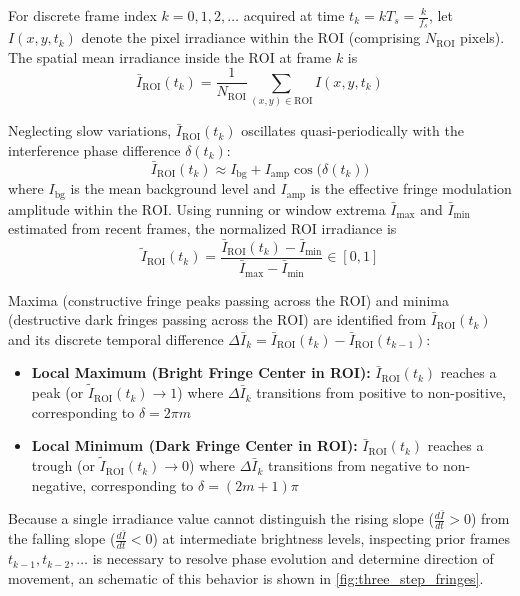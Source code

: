 For discrete frame index $k = 0, 1, 2, \dots$ acquired at time $t_k = k T_s = \frac{k}{f_s}$, let $I(x, y, t_k)$ denote the pixel irradiance within the $\text{ROI}$ (comprising $N_{\text{ROI}}$ pixels). The spatial mean irradiance inside the $\text{ROI}$ at frame $k$ is
\begin{equation}
    \bar{I}_{\text{ROI}}(t_k) = \frac{1}{N_{\text{ROI}}} \sum_{(x, y) \in \text{ROI}} I(x, y, t_k)
    \label{eq:roi_mean_irradiance}
\end{equation}

Neglecting slow variations, $\bar{I}_{\text{ROI}}(t_k)$ oscillates quasi-periodically with the interference phase difference $\delta(t_k)$:
\begin{equation}
    \bar{I}_{\text{ROI}}(t_k) \approx I_{\text{bg}} + I_{\text{amp}} \cos\!\bigl(\delta(t_k)\bigr)
    \label{eq:roi_irradiance_model}
\end{equation}
where $I_{\text{bg}}$ is the mean background level and $I_{\text{amp}}$ is the effective fringe modulation amplitude within the $\text{ROI}$. Using running or window extrema $\bar{I}_{\max}$ and $\bar{I}_{\min}$ estimated from recent frames, the normalized ROI irradiance is
\begin{equation}
    \tilde{I}_{\text{ROI}}(t_k) = \frac{\bar{I}_{\text{ROI}}(t_k) - \bar{I}_{\min}}{\bar{I}_{\max} - \bar{I}_{\min}} \in [0, 1]
    \label{eq:normalized_roi_irradiance}
\end{equation}

Maxima (constructive fringe peaks passing across the $\text{ROI}$) and minima (destructive dark fringes passing across the $\text{ROI}$) are identified from $\bar{I}_{\text{ROI}}(t_k)$ and its discrete temporal difference $\Delta \bar{I}_k = \bar{I}_{\text{ROI}}(t_k) - \bar{I}_{\text{ROI}}(t_{k-1})$:
\begin{itemize}
    \item \textbf{Local Maximum (Bright Fringe Center in ROI):} $\bar{I}_{\text{ROI}}(t_k)$ reaches a peak (or $\tilde{I}_{\text{ROI}}(t_k) \to 1$) where $\Delta \bar{I}_k$ transitions from positive to non-positive, corresponding to $\delta = 2\pi m$
    \item \textbf{Local Minimum (Dark Fringe Center in ROI):} $\bar{I}_{\text{ROI}}(t_k)$ reaches a trough (or $\tilde{I}_{\text{ROI}}(t_k) \to 0$) where $\Delta \bar{I}_k$ transitions from negative to non-negative, corresponding to $\delta = (2m + 1) \pi$
\end{itemize}
Because a single irradiance value cannot distinguish the rising slope ($\frac{d\bar{I}}{dt} > 0$) from the falling slope ($\frac{d\bar{I}}{dt} < 0$) at intermediate brightness levels, inspecting prior frames $t_{k-1}, t_{k-2}, \dots$ is necessary to resolve phase evolution and determine direction of movement, an schematic of this behavior is shown in \cref{fig:three_step_fringes}.

